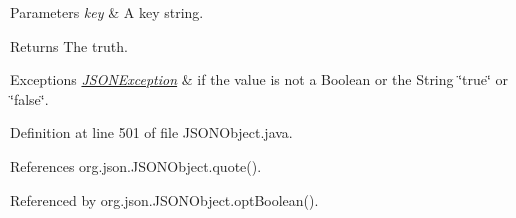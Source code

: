 \begin{DoxyParams}{Parameters}
{\em key} & A key string. \\
\hline
\end{DoxyParams}
\begin{DoxyReturn}{Returns}
The truth. 
\end{DoxyReturn}

\begin{DoxyExceptions}{Exceptions}
{\em \hyperlink{classorg_1_1json_1_1_j_s_o_n_exception}{J\-S\-O\-N\-Exception}} & if the value is not a Boolean or the String \char`\"{}true\char`\"{} or \char`\"{}false\char`\"{}. \\
\hline
\end{DoxyExceptions}


Definition at line 501 of file J\-S\-O\-N\-Object.\-java.



References org.\-json.\-J\-S\-O\-N\-Object.\-quote().



Referenced by org.\-json.\-J\-S\-O\-N\-Object.\-opt\-Boolean().


